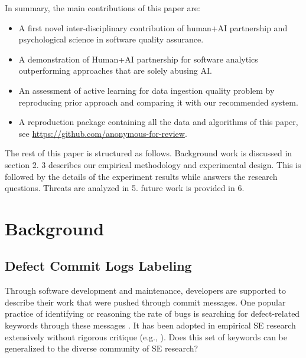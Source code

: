 \documentclass[sigconf,review, anonymous]{acmart}
\newcommand{\bi}{\begin{itemize}[leftmargin=0.4cm]}
\newcommand{\ei}{\end{itemize}}
\newenvironment{RQ}[1]%
{\noindent\begin{minipage}[c]{\linewidth}%
\begin{bclogo}[couleur=gray!25,%
                arrondi=0.1,%
                logo=\bctrombone,%
                ombre=true]{~#1}}%
{\end{bclogo}\end{minipage}\vspace{2mm}}
\begin{document}
 

\noindent
In summary, the main contributions of this paper are:
\bi
\item A first novel inter-disciplinary contribution of human+AI partnership and psychological science in software quality assurance. 
\item A demonstration of Human+AI partnership for software analytics outperforming approaches that are solely abusing AI. 
\item An assessment of active learning for data ingestion quality problem by reproducing prior approach and comparing it with our recommended system.  
\item A reproduction package containing all the data and algorithms of this paper, see \url{https://github.com/anonymous-for-review}.
\ei



The rest of this paper is structured as follows. Background work is discussed  in section 2. 3 describes our empirical methodology and experimental design.  This is followed by the details of the experiment results while answers the research questions. Threats are analyzed in 5. future work is provided in 6. 



\section{Background}

\subsection{Defect Commit Logs Labeling}

Through software development and maintenance, developers are supported to describe their work that were pushed through commit messages. One popular practice of identifying or reasoning the rate of bugs is searching for defect-related keywords through these messages \cite{mockus00changeskeys, hindle08_largecommits}. It has been adopted in empirical SE research extensively without rigorous critique (e.g., \cite{nayrolles18_clever, catolino17_jitmobile, kamei12_jit, Kim08changes}). Does this set of keywords can be generalized to the diverse community of SE research? 
\end{document}
